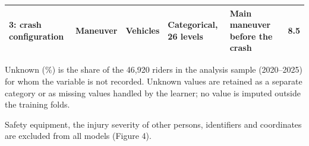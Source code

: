 \begin{table}[tp]
\begin{threeparttable}
{\begin{tabular}{p{2.6cm}p{2.5cm}p{2.0cm}p{2.6cm}p{5.6cm}r}
3: crash configuration & Maneuver & Vehicles & Categorical, 26 levels & Main maneuver before the crash & 8.5 \\
\bottomrule
\end{tabular}}
\begin{tablenotes}[flushleft]\footnotesize
\item Unknown (\%) is the share of the 46,920 riders in the analysis sample (2020–2025) for whom the variable is not recorded. Unknown values are retained as a separate category or as missing values handled by the learner; no value is imputed outside the training folds.
\item Safety equipment, the injury severity of other persons, identifiers and coordinates are excluded from all models (Figure 4).
\end{tablenotes}
\end{threeparttable}
\end{table}
